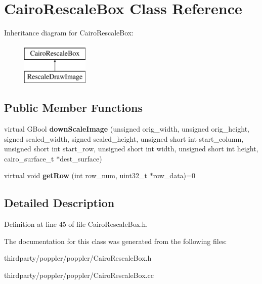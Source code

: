 \hypertarget{class_cairo_rescale_box}{}\section{Cairo\+Rescale\+Box Class Reference}
\label{class_cairo_rescale_box}
Inheritance diagram for Cairo\+Rescale\+Box\+:\begin{figure}[H]
\begin{center}
\leavevmode
\includegraphics[height=2.000000cm]{class_cairo_rescale_box}
\end{center}
\end{figure}
\subsection*{Public Member Functions}
\begin{DoxyCompactItemize}
\item 
\mbox{\label{class_cairo_rescale_box_a7faddcd57ae68f01b36a76d9f2d21c7f}} 
virtual G\+Bool {\bfseries down\+Scale\+Image} (unsigned orig\+\_\+width, unsigned orig\+\_\+height, signed scaled\+\_\+width, signed scaled\+\_\+height, unsigned short int start\+\_\+column, unsigned short int start\+\_\+row, unsigned short int width, unsigned short int height, cairo\+\_\+surface\+\_\+t $\ast$dest\+\_\+surface)
\item 
\mbox{\label{class_cairo_rescale_box_a79fe89e2abe9b013f6d1a1a868feab97}} 
virtual void {\bfseries get\+Row} (int row\+\_\+num, uint32\+\_\+t $\ast$row\+\_\+data)=0
\end{DoxyCompactItemize}


\subsection{Detailed Description}


Definition at line 45 of file Cairo\+Rescale\+Box.\+h.



The documentation for this class was generated from the following files\+:\begin{DoxyCompactItemize}
\item 
thirdparty/poppler/poppler/Cairo\+Rescale\+Box.\+h\item 
thirdparty/poppler/poppler/Cairo\+Rescale\+Box.\+cc\end{DoxyCompactItemize}
